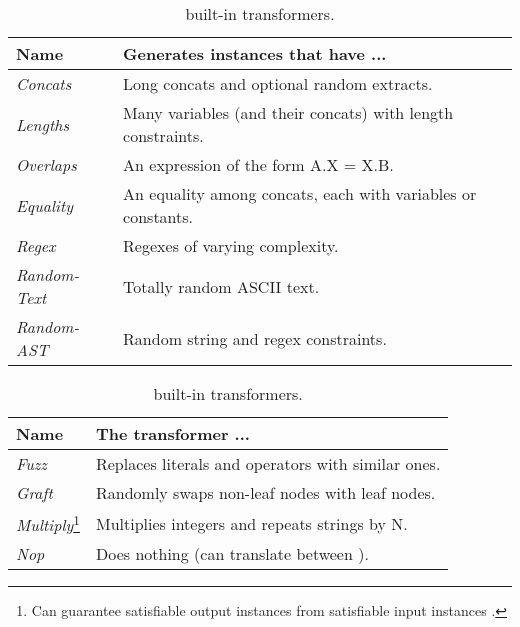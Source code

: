 \begin{table}[t]
    \caption{\fuzzer{} built-in (a) generators and (b) transformers.}
    \begin{subtable}{1\textwidth}
        \centering
        \caption{\generator{} built-in generators.}
        \label{tbl:generators}
        \begin{tabular}{ l l }
            \toprule
            \textbf{Name}
            & \textbf{Generates instances that have ...} \\
            \midrule
            \textit{Concats}
            & Long concats and optional random extracts. \\
            \textit{Lengths}
            & Many variables (and their concats) with length constraints. \\
            \textit{Overlaps}
            & An expression of the form A.X = X.B. \\
            \textit{Equality}
            & An equality among concats, each with variables or constants. \\
            \textit{Regex}
            & Regexes of varying complexity. \\
            \textit{Random-Text}
            & Totally random ASCII text. \\
            \textit{Random-AST}
            & Random string and regex constraints. \\
            \bottomrule
        \end{tabular}
    \end{subtable}
    \begin{subtable}{1\textwidth}
        \centering
        \caption{\transformer{} built-in transformers.}
        \label{tbl:transformers}
        \begin{tabular}{l l}
            \toprule
            \textbf{Name}
            & \textbf{The transformer ...} \\
            \midrule
            \textit{Fuzz}
            & Replaces literals and operators with similar ones.\\
            \textit{Graft}
            & Randomly swaps non-leaf nodes with leaf nodes.\\
            \textit{Multiply}\footnote{Can guarantee satisfiable output
            instances from satisfiable input instances \cite{website}.}
            & Multiplies integers and repeats strings by N.\\
            \textit{Nop}
            & Does nothing (can translate between \smtfull{}).\\

\end{tabular}
\end{subtable}
\end{table}

